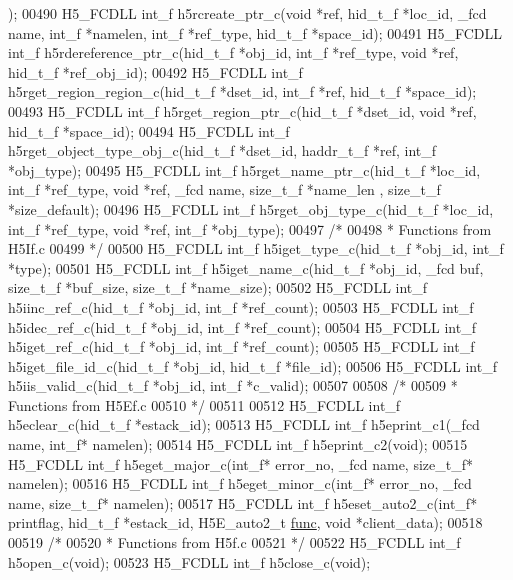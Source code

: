 \begin{DoxyCode}
      );
00490 H5\_FCDLL int\_f h5rcreate\_ptr\_c(\textcolor{keywordtype}{void} *ref, hid\_t\_f *loc\_id, \_fcd name, int\_f *namelen, int\_f *ref\_type, 
      hid\_t\_f *space\_id);
00491 H5\_FCDLL int\_f h5rdereference\_ptr\_c(hid\_t\_f *obj\_id, int\_f *ref\_type, \textcolor{keywordtype}{void} *ref, hid\_t\_f *ref\_obj\_id);
00492 H5\_FCDLL int\_f h5rget\_region\_region\_c(hid\_t\_f *dset\_id, int\_f *ref, hid\_t\_f *space\_id);
00493 H5\_FCDLL int\_f h5rget\_region\_ptr\_c(hid\_t\_f *dset\_id, \textcolor{keywordtype}{void} *ref, hid\_t\_f *space\_id);
00494 H5\_FCDLL int\_f h5rget\_object\_type\_obj\_c(hid\_t\_f *dset\_id, haddr\_t\_f *ref, int\_f *obj\_type);
00495 H5\_FCDLL int\_f h5rget\_name\_ptr\_c(hid\_t\_f *loc\_id, int\_f *ref\_type, \textcolor{keywordtype}{void} *ref, \_fcd name, size\_t\_f *name\_len
      , size\_t\_f *size\_default);
00496 H5\_FCDLL int\_f h5rget\_obj\_type\_c(hid\_t\_f *loc\_id, int\_f *ref\_type, \textcolor{keywordtype}{void} *ref, int\_f *obj\_type);
00497 \textcolor{comment}{/*}
00498 \textcolor{comment}{ * Functions from H5If.c}
00499 \textcolor{comment}{ */}
00500 H5\_FCDLL int\_f h5iget\_type\_c(hid\_t\_f *obj\_id, int\_f *type);
00501 H5\_FCDLL int\_f h5iget\_name\_c(hid\_t\_f *obj\_id, \_fcd buf, size\_t\_f *buf\_size, size\_t\_f *name\_size);
00502 H5\_FCDLL int\_f h5iinc\_ref\_c(hid\_t\_f *obj\_id, int\_f *ref\_count);
00503 H5\_FCDLL int\_f h5idec\_ref\_c(hid\_t\_f *obj\_id, int\_f *ref\_count);
00504 H5\_FCDLL int\_f h5iget\_ref\_c(hid\_t\_f *obj\_id, int\_f *ref\_count);
00505 H5\_FCDLL int\_f h5iget\_file\_id\_c(hid\_t\_f *obj\_id, hid\_t\_f *file\_id);
00506 H5\_FCDLL int\_f h5iis\_valid\_c(hid\_t\_f *obj\_id, int\_f *c\_valid);
00507 
00508 \textcolor{comment}{/*}
00509 \textcolor{comment}{ * Functions from H5Ef.c}
00510 \textcolor{comment}{ */}
00511 
00512 H5\_FCDLL int\_f h5eclear\_c(hid\_t\_f *estack\_id);
00513 H5\_FCDLL int\_f h5eprint\_c1(\_fcd name, int\_f* namelen);
00514 H5\_FCDLL int\_f h5eprint\_c2(\textcolor{keywordtype}{void});
00515 H5\_FCDLL int\_f h5eget\_major\_c(int\_f* error\_no, \_fcd name, size\_t\_f* namelen);
00516 H5\_FCDLL int\_f h5eget\_minor\_c(int\_f* error\_no, \_fcd name, size\_t\_f* namelen);
00517 H5\_FCDLL int\_f h5eset\_auto2\_c(int\_f* printflag, hid\_t\_f *estack\_id, H5E\_auto2\_t 
      \hyperlink{structfunc}{func}, \textcolor{keywordtype}{void} *client\_data);
00518 
00519 \textcolor{comment}{/*}
00520 \textcolor{comment}{ * Functions from H5f.c}
00521 \textcolor{comment}{ */}
00522 H5\_FCDLL int\_f h5open\_c(\textcolor{keywordtype}{void});
00523 H5\_FCDLL int\_f h5close\_c(\textcolor{keywordtype}{void});

\end{DoxyCode}

